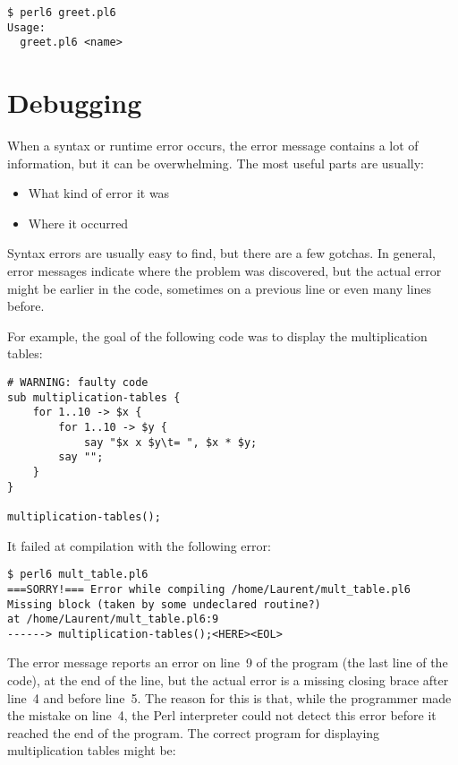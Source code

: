 \begin{verbatim}
$ perl6 greet.pl6
Usage:
  greet.pl6 <name>
\end{verbatim}


\section{Debugging}
\label{whitespace}

When a syntax or runtime error occurs, the error message contains
a lot of information, but it can be overwhelming.  The most
useful parts are usually:

\begin{itemize}

\item What kind of error it was

\item Where it occurred

\end{itemize}

Syntax errors are usually easy to find, but there are a few
gotchas. In general, error messages indicate where the problem 
was discovered, but the actual error might be earlier in 
the code, sometimes on a previous line or even many lines 
before.

For example, the goal of the following code was to display the 
multiplication tables:

\begin{verbatim}
# WARNING: faulty code
sub multiplication-tables {
    for 1..10 -> $x {
        for 1..10 -> $y {
            say "$x x $y\t= ", $x * $y;
        say "";
    }
}

multiplication-tables();
\end{verbatim}

It failed at compilation with the following error:

\begin{verbatim}
$ perl6 mult_table.pl6
===SORRY!=== Error while compiling /home/Laurent/mult_table.pl6
Missing block (taken by some undeclared routine?)
at /home/Laurent/mult_table.pl6:9
------> multiplication-tables();<HERE><EOL>
\end{verbatim}

The error message reports an error on line~9 of the program 
(the last line of the code), at the end of the line, but 
the actual error is a missing closing brace after line~4 
and before line~5. The reason for this is that, while the 
programmer made the mistake on line~4, the Perl interpreter 
could not detect this error before it reached the 
end of the program. The correct program for displaying 
multiplication tables might be:

